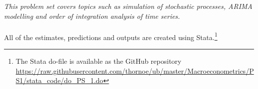 \textit{This problem set covers topics such as simulation of stochastic processes, ARIMA
modelling and order of integration analysis of time series.}
\\ \\
All of the estimates, predictions and outputs are created using Stata.\footnote{The Stata do-file is available as the GitHub repository\\\href{https://raw.githubusercontent.com/thornoe/ub/master/Macroeconometrics/PS1/stata_code/do_PS_1.do}{https://raw.githubusercontent.com/thornoe/ub/master/Macroeconometrics/PS1/stata\_code/do\_PS\_1.do}}

